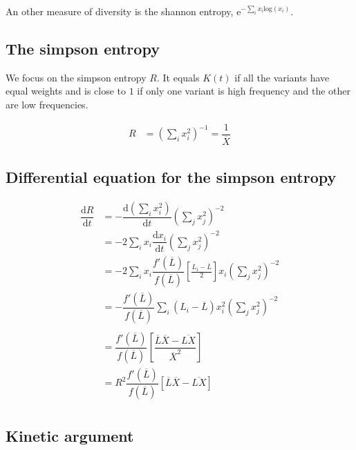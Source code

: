 \documentclass{article}
\begin{document}
An other measure of diversity is the shannon entropy, $\mathrm{e}^{ - \sum_i x_i \mathrm{log}(x_i)}$. 

\subsection{The simpson entropy}
We focus on the simpson entropy $R$. It equals $K(t)$ if all the variants have equal weights and is close to $1$ if only one variant is high frequency and the other are low frequencies.

\begin{equation}
  \begin{aligned}
     R &= \left( \sum_i x_i^2  \right)^{-1} = \dfrac{1}{\overline{X}}
  \end{aligned}
\end{equation}

\subsection{Differential equation for the simpson entropy}
\begin{equation}
  \begin{aligned}
    \dfrac{\mathrm{d} R }{\mathrm{d}t} &=
    - \dfrac{\mathrm{d} \left( \sum_i x_i^2  \right)}{\mathrm{d}t} \left( \sum_j x_j^2  \right)^{-2} \\
    &=
   - 2  \sum_i x_i \dfrac{\mathrm{d} x_i }{\mathrm{d}t} \left( \sum_j x_j^2  \right)^{-2} \\
    &=
    - 2  \sum_i x_i \dfrac{f'(\overline{L})}{f(\overline{L})} \left[ \tfrac{L_i - \overline{L}}{2} \right]x_i \left( \sum_j x_j^2  \right)^{-2} \\
    &=
    - \dfrac{f'(\overline{L})}{f(\overline{L})} \sum_i (L_i - \overline{L})  x_i^2 \left( \sum_j x_j^2  \right)^{-2} \\
     \\
      &=
     \dfrac{f'(\overline{L})}{f(\overline{L})} \left[ \dfrac{\overline{L} \overline{X} - \overline{L X}}{ \overline{X} ^{2}} \right] \\
     &=
     R^2 \dfrac{f'(\overline{L})}{f(\overline{L})} \left[ \overline{L} \overline{X} - \overline{L X} \right] \\
  \end{aligned}
\end{equation}

\subsection{Kinetic argument}
\end{document}
